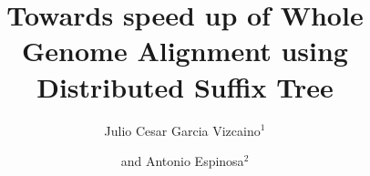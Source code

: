 \documentclass[10pt]{bmc_article}
\newenvironment{bmcformat}{\begin{raggedright}\baselineskip20pt\sloppy\setboolean{publ}{false}}{\end{raggedright}\baselineskip20pt\sloppy}
\begin{document}
\begin{bmcformat}



\title{Towards speed up of Whole Genome Alignment using Distributed Suffix Tree}
 


\author{Julio Cesar Garcia Vizcaino\correspondingauthor$^{1}$%
      \and
       and 
         Antonio Espinosa$^2$%
      }
      


\address{%
    \iid(1)Computer Architecture \& Operating Systems Department (CAOS), Universitat Autònoma de Barcelona,%
    Bellaterra (Barcelona), Spain.\\
    \iid(2)Computer Architecture \& Operating Systems Department (CAOS), Universitat Autònoma de Barcelona,%
    Bellaterra (Barcelona), Spain.
}%

\maketitle




\end{bmcformat}
\end{document}
